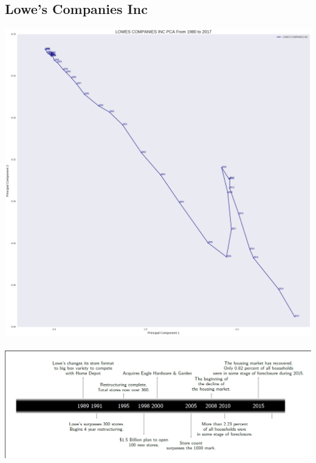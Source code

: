 \subsection{Lowe's Companies Inc}
\includegraphics[width=1\textwidth]{./Lowes}\\[0.1in] \\
\includegraphics[width=1\textwidth]{./Lowestimeline}\\[0.1in] \\
